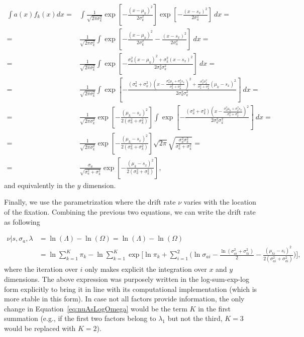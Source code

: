 \documentclass{article}
\begin{document}
\begin{equation}
\begin{aligned}
\int a(x)f_k(x) dx = & \int \frac{1}{\sqrt{2\pi\sigma_k^2}} \exp\left[-\frac{(x-\mu_k)^2}{2\sigma_k^2}\right] \exp\left[-\frac{(x-s_x)^2}{2\sigma_a^2}\right]~dx = \\
= & \frac{1}{\sqrt{2\pi\sigma_k^2}} \int \exp\left[-\frac{(x-\mu_k)^2}{2\sigma_k^2} - \frac{(x-s_x)^2}{2\sigma_a^2}\right]~dx = \\
= & \frac{1}{\sqrt{2\pi\sigma_k^2}} \int \exp\left[-\frac{\sigma_a^2(x-\mu_k)^2 + \sigma_k^2(x-s_x)^2}{2\sigma_a^2\sigma_k^2} \right]~dx = \\
= & \frac{1}{\sqrt{2\pi\sigma_k^2}} \int \exp\left[-\frac{(\sigma_a^2+\sigma_k^2)\left(x-\frac{\sigma_a^2\mu_k + \sigma_k^2s_x}{\sigma_a^2+\sigma_k^2}\right)^2 + \frac{\sigma_a^2\sigma_k^2}{\sigma_a^2 + \sigma_k^2}(\mu_k-s_x)^2}{2\sigma_a^2\sigma_k^2} \right]~dx = \\
= & \frac{1}{\sqrt{2\pi\sigma_k^2}} \exp\left[-\frac{(\mu_k-s_x)^2}{2(\sigma_a^2 + \sigma_k^2)}\right] \int \exp\left[-\frac{(\sigma_a^2+\sigma_k^2)\left(x-\frac{\sigma_a^2\mu_k + \sigma_k^2s_x}{\sigma_a^2+\sigma_k^2}\right)^2}{2\sigma_a^2\sigma_k^2} \right]~dx = \\
= & \frac{1}{\sqrt{2\pi\sigma_k^2}} \exp\left[-\frac{(\mu_k-s_x)^2}{2(\sigma_a^2 + \sigma_k^2)}\right] \sqrt{2\pi} \sqrt{\frac{\sigma_a^2\sigma_k^2}{\sigma_a^2+\sigma_k^2}} = \\
= & \frac{\sigma_a}{\sqrt{\sigma_a^2+\sigma_k^2}} \exp\left[-\frac{(\mu_k-s_x)^2}{2(\sigma_a^2 + \sigma_k^2)}\right],
\end{aligned}
\end{equation}
and equivalently in the $y$ dimension.

Finally, we use the parametrization where the drift rate $\nu$ varies with the location of the fixation. Combining the previous two equations, we can write the drift rate as following

\begin{equation}
\label{eq:nuAsLogOmega}
\begin{aligned}
\nu | s, \sigma_a, \lambda & = \ln(\Lambda) - \ln(\Omega) = \ln(\Lambda) - \ln(\Omega) \\
& = \ln\sum_{k=1}^K \pi_k- \ln \sum_{k=1}^K \exp \Bigg[\ln \pi_k + \sum_{i=1}^2 \Big( \ln \sigma_{ai} - \frac{\ln (\sigma_{ai}^2+ \sigma_{ki}^2)}{2} - \frac{(\mu_{ki} - s_i)^2}{2(\sigma_{ai}^2 + \sigma_{ki}^2)} \Big)  \Bigg],
\end{aligned}
\end{equation}
where the iteration over $i$ only makes explicit the integration over $x$ and $y$ dimensions. The above expression was purposely written in the log-sum-exp-log form explicitly to bring it in line with its computational implementation (which is more stable in this form). In case not all factors provide information, the only change in Equation~\ref{eq:nuAsLogOmega} would be the term $K$ in the first summation (e.g., if the first two factors belong to $\lambda_1$ but not the third, $K=3$ would be replaced with $K=2$).
\end{document}
